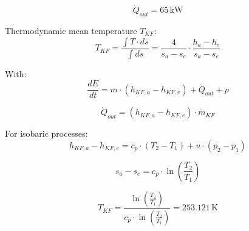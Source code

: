 \[ \dot{Q}_{out} = 65 \, \text{kW} \]  

Thermodynamic mean temperature \( T_{KF} \):  
\[ T_{KF} = \frac{\int T \cdot ds}{\int ds} = \frac{4}{s_{a} - s_{e}} \cdot \frac{h_{a} - h_{e}}{s_{a} - s_{e}} \]  

With:  
\[ \frac{dE}{dt} = m \cdot (h_{KF,a} - h_{KF,e}) + \dot{Q}_{out} + p \]  

\[ \dot{Q}_{out} = (h_{KF,a} - h_{KF,e}) \cdot \dot{m}_{KF} \]  

For isobaric processes:  
\[ h_{KF,a} - h_{KF,e} = c_{p} \cdot (T_{2} - T_{1}) + u \cdot (p_{2} - p_{1}) \]  

\[ s_{a} - s_{e} = c_{p} \cdot \ln \left( \frac{T_{2}}{T_{1}} \right) \]  

\[ T_{KF} = \frac{\ln \left( \frac{T_{2}}{T_{1}} \right)}{c_{p} \cdot \ln \left( \frac{T_{2}}{T_{1}} \right)} = 253.121 \, \text{K} \]